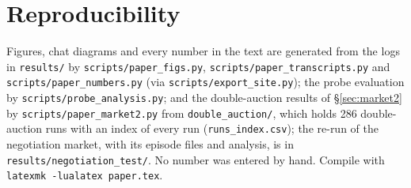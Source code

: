 \documentclass[10pt]{article}
\begin{document}
\section{Reproducibility}\sloppy
Figures, chat diagrams and every number in the text are generated from the logs in \texttt{results/} by
\texttt{scripts/paper\_figs.py}, \texttt{scripts/paper\_transcripts.py} and \texttt{scripts/paper\_numbers.py} (via
\texttt{scripts/export\_site.py}); the probe evaluation by \texttt{scripts/probe\_analysis.py}; and the double-auction
results of \S\ref{sec:market2} by \texttt{scripts/paper\_market2.py} from \texttt{double\_auction/}, which holds 286
double-auction runs with an index of every run (\texttt{runs\_index.csv}); the re-run of the negotiation market, with its
episode files and analysis, is in \texttt{results/negotiation\_test/}. No number was entered by hand. Compile with
\texttt{latexmk -lualatex paper.tex}.
\end{document}
